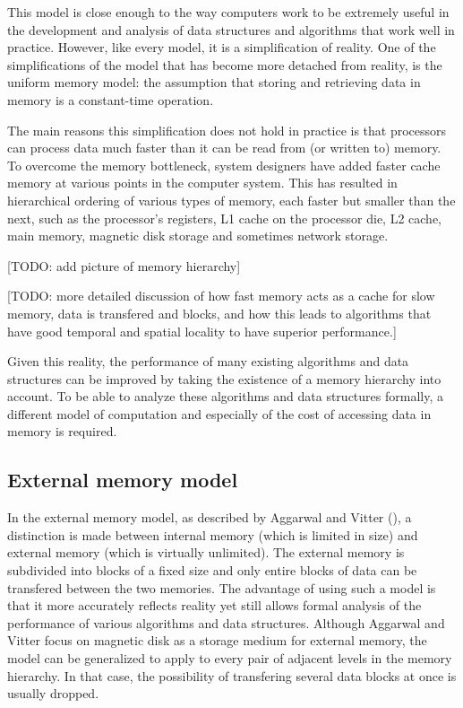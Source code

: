 \documentclass{acm_proc_article-sp}
\begin{document}
This model is close enough to the way computers work to be extremely useful in the development and analysis of data structures and algorithms that work well in practice. However, like every model, it is a simplification of reality. One of the simplifications of the model that has become more detached from reality, is the uniform memory model: the assumption that storing and retrieving data in memory is a constant-time operation.

The main reasons this simplification does not hold in practice is that processors can process data much faster than it can be read from (or written to) memory. To overcome the memory bottleneck, system designers have added faster cache memory at various points in the computer system. This has resulted in hierarchical ordering of various types of memory, each faster but smaller than the next, such as the processor's registers, L1 cache on the processor die, L2 cache, main memory, magnetic disk storage and sometimes network storage.

[TODO: add picture of memory hierarchy]

[TODO: more detailed discussion of how fast memory acts as a cache for slow memory, data is transfered and blocks, and how this leads to algorithms that have good temporal and spatial locality to have superior performance.]

Given this reality, the performance of many existing algorithms and data structures can be improved by taking the existence of a memory hierarchy into account. To be able to analyze these algorithms and data structures formally, a different model of computation and especially of the cost of accessing data in memory is required.

\subsection{External memory model}
In the external memory model, as described by Aggarwal and Vitter (\cite{aggarwal1988ioc}), a distinction is made between internal memory (which is limited in size) and external memory (which is virtually unlimited). The external memory is subdivided into blocks of a fixed size and only entire blocks of data can be transfered between the two memories. The advantage of using such a model is that it more accurately reflects reality yet still allows formal analysis of the performance of various algorithms and data structures. Although Aggarwal and Vitter focus on magnetic disk as a storage medium for external memory, the model can be generalized to apply to every pair of adjacent levels in the memory hierarchy. In that case, the possibility of transfering several data blocks at once is usually dropped.
\end{document}
